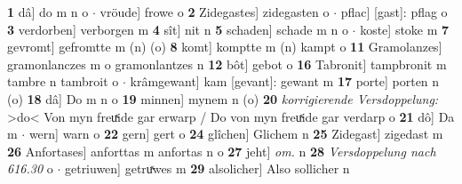 \documentclass[8pt,a4paper,notitlepage]{article}
\begin{document}
\begin{table}[ht]
\begin{minipage}[t]{0.5\linewidth}
\textbf{1} dâ] do m n o  $\cdot$ vröude] frowe o \textbf{2} Zidegastes] zidegasten o  $\cdot$ pflac] [gast]: pflag o \textbf{3} verdorben] verborgen m \textbf{4} sît] nit n \textbf{5} schaden] schade m n o  $\cdot$ koste] stoke m \textbf{7} gevromt] gefromtte m (n) (o) \textbf{8} komt] komptte m (n) kampt o \textbf{11} Gramolanzes] gramonlanczes m o gramonlantzes n \textbf{12} bôt] gebot o \textbf{16} Tabronit] tampbronit m tambre n tambroit o  $\cdot$ krâmgewant] kam [gevant]: gewant m \textbf{17} porte] porten n (o) \textbf{18} dâ] Do m n o \textbf{19} minnen] mynem n (o) \textbf{20} \textit{korrigierende Versdoppelung:} >do< Von myn freuͯide gar erwarp / Do von myn freuͯide gar verdarp o  \textbf{21} dô] Da m  $\cdot$ wern] warn o \textbf{22} gern] gert o \textbf{24} glîchen] Glichem n \textbf{25} Zidegast] zigedast m \textbf{26} Anfortases] anforttas m anfortas n o \textbf{27} jeht] \textit{om.} n \textbf{28} \textit{Versdoppelung nach 616.30} o   $\cdot$ getriuwen] getruͯwes m \textbf{29} alsolicher] Also sollicher n \newline
\end{minipage}
\end{table}
\newpage
\end{document}
